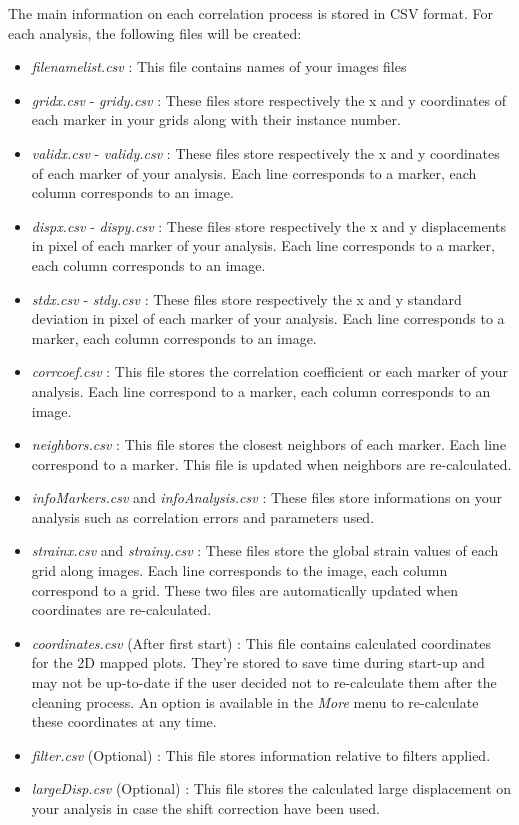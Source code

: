 \indent\indent The main information on each correlation process is stored in CSV format. For each analysis, the following files will be created:
\begin{itemize}
  \item \textit{filenamelist.csv} : This file contains names of your images files
  \item \textit{gridx.csv} - \textit{gridy.csv} : These files store respectively the x and y coordinates of each marker in your grids along with their instance number.
  \item \textit{validx.csv} - \textit{validy.csv} : These files store respectively the x and y coordinates of each marker of your analysis. Each line corresponds to a marker, each column corresponds to an image.
  \item \textit{dispx.csv} - \textit{dispy.csv} : These files store respectively the x and y displacements in pixel of each marker of your analysis. Each line corresponds to a marker, each column corresponds to an image.
  \item \textit{stdx.csv} - \textit{stdy.csv} : These files store respectively the x and y standard deviation in pixel of each marker of your analysis. Each line corresponds to a marker, each column corresponds to an image.
  \item \textit{corrcoef.csv} : This file stores the correlation coefficient or each marker of your analysis. Each line correspond to a marker, each column corresponds to an image.
  \item \textit{neighbors.csv} : This file stores the closest neighbors of each marker. Each line correspond to a marker. This file is updated when neighbors are re-calculated.
  \item \textit{infoMarkers.csv} and \textit{infoAnalysis.csv} : These files store informations on your analysis such as correlation errors and parameters used.
  \item \textit{strainx.csv} and \textit{strainy.csv} : These files store the global strain values of each grid along images. Each line corresponds to the image, each column correspond to a grid. These two files are automatically updated when coordinates are re-calculated.
  \item \textit{coordinates.csv} (After first start) : This file contains calculated coordinates for the 2D mapped plots. They're stored to save time during start-up and may not be up-to-date if the user decided not to re-calculate them after the cleaning process. An option is available in the \textit{More} menu to re-calculate these coordinates at any time. 
  \item \textit{filter.csv} (Optional) : This file stores information relative to filters applied.
  \item \textit{largeDisp.csv} (Optional) : This file stores the calculated large displacement on your analysis in case the shift correction have been used.
\end{itemize}

